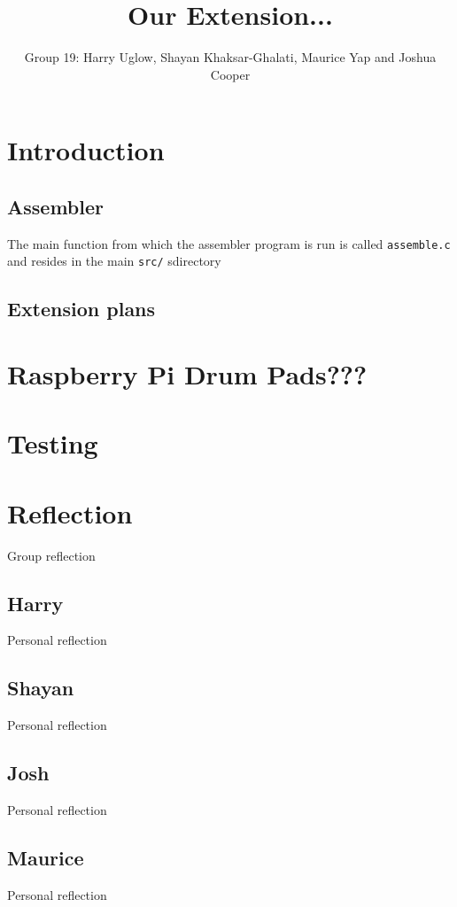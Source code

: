 \documentclass[11pt]{article}
\begin{document}
\title{Our Extension...}
\author{Group 19: Harry Uglow, Shayan Khaksar-Ghalati, Maurice Yap and Joshua Cooper}

\maketitle

\section{Introduction}

\subsection{Assembler}

The main function from which the assembler program is run is called \texttt{assemble.c} and resides in the main \texttt{src/} sdirectory

\subsection{Extension plans}

\section{Raspberry Pi Drum Pads???}

\section{Testing}

\section{Reflection}
Group reflection

\subsection{Harry}
Personal reflection

\subsection{Shayan}
Personal reflection

\subsection{Josh}
Personal reflection

\subsection{Maurice}
Personal reflection
\end{document}

